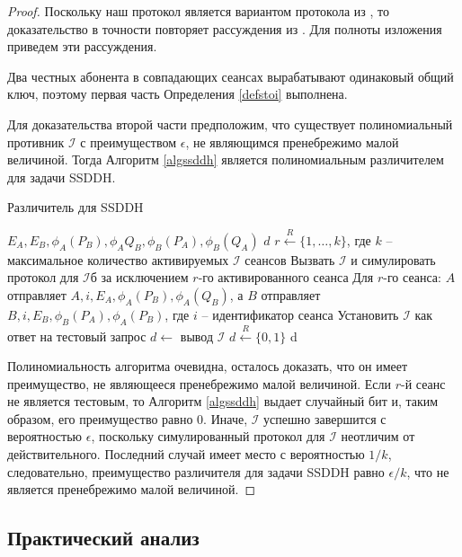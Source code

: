 \documentclass[a4paper,12pt]{article}
\theoremstyle{definition}
\begin{document}
\begin{proof}
 Поскольку наш протокол является вариантом протокола из \cite{DF}, то доказательство в точности повторяет рассуждения из \cite[Theorem 6.1]{DF}. Для полноты изложения приведем эти рассуждения.

Два честных абонента в совпадающих сеансах вырабатывают одинаковый общий ключ, поэтому первая часть Определения \ref{defstoi} выполнена.

Для доказательства второй части предположим, что существует полиномиальный противник $\mathcal{I}$ с преимуществом $\epsilon$, не являющимся пренебрежимо малой величиной.
Тогда Алгоритм \ref{algssddh} является полиномиальным различителем для задачи SSDDH.

\begin{algorithm}
\caption{Различитель для SSDDH}
 \label{algssddh}
 \begin{algorithmic}[1]
\Require   $E_A, E_B, \phi_A(P_B),\phi_A{Q_B},\phi_B(P_A),\phi_B(Q_A)$
\Ensure  $d$
 \State $r\stackrel{R}{\gets}\{1,\dots,k\}$, где $k$ -- максимальное количество активируемых $\mathcal{I}$ сеансов
  \State Вызвать $\mathcal{I}$ и симулировать протокол для $\mathcal{I}$б за исключением $r$-го активированного сеанса
  \State Для $r$-го сеанса: $A$ отправляет $A,i,E_A,\phi_A(P_B),\phi_A(Q_B)$, а $B$ отправляет $B,i,E_B,\phi_B(P_A),\phi_A(P_B)$, где $i$ -- идентификатор сеанса
  \State Установить $\mathcal{I}$ как ответ на тестовый запрос
  \State $d\gets $ вывод $\mathcal{I}$
  \Else 
  \State $d\stackrel{R}{\gets}\{0,1\}$
  \EndIf
  \State \Return d
 \end{algorithmic}

\end{algorithm}

Полиномиальность алгоритма очевидна, осталось доказать, что он имеет преимущество, не являющееся пренебрежимо малой величиной.
Если $r$-й сеанс не является тестовым, то Алгоритм \ref{algssddh} выдает случайный бит и, таким образом, его преимущество равно $0$.
Иначе, $\mathcal{I}$  успешно завершится с вероятностью $\epsilon$, поскольку симулированный протокол для $\mathcal{I}$  неотличим от действительного.
Последний случай имеет место с вероятностью $1/k$, следовательно, преимущество различителя для задачи SSDDH равно $\epsilon/k$, что не является пренебрежимо малой величиной.
 \end{proof}



\subsection{Практический анализ}
\end{document}
